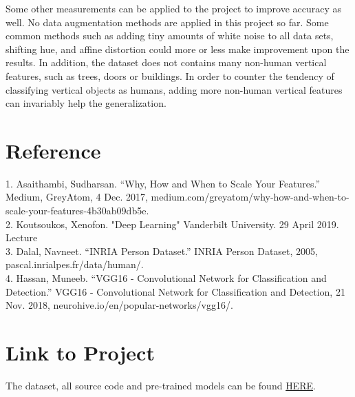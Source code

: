 \documentclass[twocolumn, 12pt]{article}
\begin{document}
Some other measurements can be applied to the project to improve accuracy as well. No data augmentation methods are applied in this project so far. Some common methods such as adding tiny amounts of white noise to all data sets, shifting hue, and affine distortion could more or less make improvement upon the results. In addition, the dataset does not contains many non-human vertical features, such as trees, doors or buildings. In order to counter the tendency of classifying vertical objects as humans, adding more non-human vertical features can invariably help the generalization.

\section{Reference}
1. Asaithambi, Sudharsan. “Why, How and When to Scale Your Features.” Medium, GreyAtom, 4 Dec. 2017, medium.com/greyatom/why-how-and-when-to-scale-your-features-4b30ab09db5e.\\

2. Koutsoukos, Xenofon. "Deep Learning" Vanderbilt University. 29 April 2019. Lecture\\

3. Dalal, Navneet. “INRIA Person Dataset.” INRIA Person Dataset, 2005, pascal.inrialpes.fr/data/human/.\\

4. Hassan, Muneeb. “VGG16 - Convolutional Network for Classification and Detection.” VGG16 - Convolutional Network for Classification and Detection, 21 Nov. 2018, neurohive.io/en/popular-networks/vgg16/.
\section{Link to Project}
The dataset, all source code and pre-trained models can be found \href{https://github.com/Lingfeng158/DLHumanDetection}{HERE}.
\end{document}
